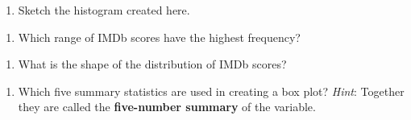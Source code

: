 \documentclass[
]{report}
\providecommand{\tightlist}{%
  \setlength{\itemsep}{0pt}\setlength{\parskip}{0pt}}
\begin{document}
\newpage

\begin{enumerate}
\def\labelenumi{\arabic{enumi}.}
\setcounter{enumi}{7}
\tightlist
\item
  Sketch the histogram created here.
\end{enumerate}

\vspace{1in}

\begin{enumerate}
\def\labelenumi{\arabic{enumi}.}
\setcounter{enumi}{8}
\tightlist
\item
  Which range of IMDb scores have the highest frequency?
\end{enumerate}

\vspace{0.3in}

\begin{enumerate}
\def\labelenumi{\arabic{enumi}.}
\setcounter{enumi}{9}
\tightlist
\item
  What is the shape of the distribution of IMDb scores?
\end{enumerate}

\vspace{0.3in}

\begin{enumerate}
\def\labelenumi{\arabic{enumi}.}
\setcounter{enumi}{10}
\tightlist
\item
  Which five summary statistics are used in creating a box plot? \emph{Hint}: Together they are called the \textbf{five-number summary} of the variable.
\end{enumerate}

\vspace{0.3in}
\end{document}
